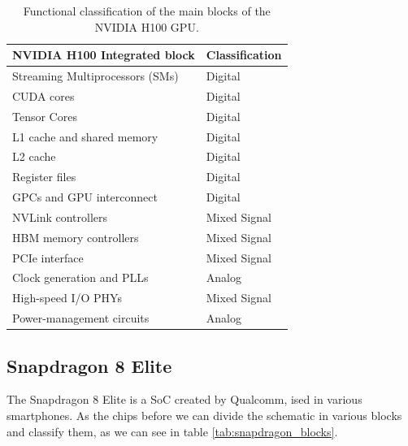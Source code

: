 \documentclass[twocolumn]{article}
\begin{document}
\begin{table}[h]
    \centering
    \begin{tabular}{p{} p{}}
        \hline
        \textbf{NVIDIA H100 Integrated block} & \textbf{Classification} \\
        \hline
        Streaming Multiprocessors (SMs) & Digital \\
        CUDA cores & Digital \\
        Tensor Cores & Digital \\
        L1 cache and shared memory & Digital \\
        L2 cache & Digital \\
        Register files & Digital \\
        GPCs and GPU interconnect & Digital \\
        NVLink controllers & Mixed Signal \\
        HBM memory controllers & Mixed Signal \\
        PCIe interface & Mixed Signal \\
        Clock generation and PLLs & Analog \\
        High-speed I/O PHYs & Mixed Signal \\
        Power-management circuits & Analog \\
        \hline
    \end{tabular}
    \caption{Functional classification of the main blocks of the NVIDIA H100 GPU.}
    \label{tab:h100_blocks}
    \renewcommand{\arraystretch}{1.15}
\end{table}

\subsection{Snapdragon 8 Elite}

The Snapdragon 8 Elite is a SoC created by Qualcomm, ised in various smartphones. As the chips before we can divide the schematic in various blocks and classify them, as we can see in table \ref{tab:snapdragon_blocks}. \cite{qualcomm_snapdragon8elite_2024} \cite{qualcomm_snapdragon8elite_announcement_2024}
\end{document}

